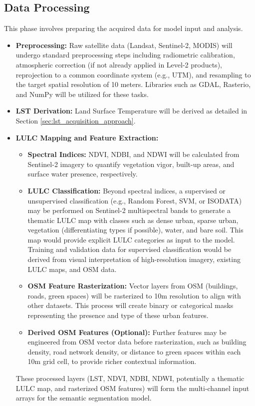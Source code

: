 \documentclass{article}
\begin{document}
\subsection{Data Processing} %
This phase involves preparing the acquired data for model input and analysis.
\begin{itemize}
    \item \textbf{Preprocessing:} Raw satellite data (Landsat, Sentinel-2, MODIS) will undergo standard preprocessing steps including radiometric calibration, atmospheric correction (if not already applied in Level-2 products), reprojection to a common coordinate system (e.g., UTM), and resampling to the target spatial resolution of 10 meters. Libraries such as GDAL, Rasterio, and NumPy will be utilized for these tasks.
    \item \textbf{LST Derivation:} Land Surface Temperature will be derived as detailed in Section \ref{sec:lst_acquisition_approach}. %

    \item \textbf{LULC Mapping and Feature Extraction:}
        \begin{itemize}
            \item \textbf{Spectral Indices:} NDVI, NDBI, and NDWI will be calculated from Sentinel-2 imagery to quantify vegetation vigor, built-up areas, and surface water presence, respectively.
            \item \textbf{LULC Classification:} Beyond spectral indices, a supervised or unsupervised classification (e.g., Random Forest, SVM, or ISODATA) may be performed on Sentinel-2 multispectral bands to generate a thematic LULC map with classes such as dense urban, sparse urban, vegetation (differentiating types if possible), water, and bare soil. This map would provide explicit LULC categories as input to the model. Training and validation data for supervised classification would be derived from visual interpretation of high-resolution imagery, existing LULC maps, and OSM data.
            \item \textbf{OSM Feature Rasterization:} Vector layers from OSM (buildings, roads, green spaces) will be rasterized to 10m resolution to align with other datasets. This process will create binary or categorical masks representing the presence and type of these urban features.
            \item \textbf{Derived OSM Features (Optional):} Further features may be engineered from OSM vector data before rasterization, such as building density, road network density, or distance to green spaces within each 10m grid cell, to provide richer contextual information.
        \end{itemize}
    These processed layers (LST, NDVI, NDBI, NDWI, potentially a thematic LULC map, and rasterized OSM features) will form the multi-channel input arrays for the semantic segmentation model.


\end{itemize}
\end{document}
